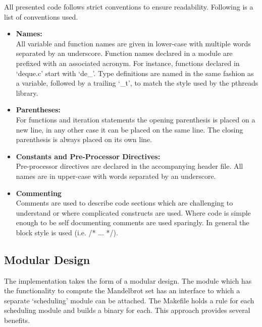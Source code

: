 All presented code follows strict conventions to ensure readability. Following is a list of conventions used.
\begin{itemize}
\item \textbf{Names: } \\
            All variable and function names are given in lower-case with multiple words separated by an underscore.
            Function names declared in a module are prefixed with an associated acronym. For instance, functions declared in 
            `deque.c' start with `de\_'.
            Type definitions are named in the same fashion as a variable, followed by a trailing `\_t', to match the style used 
            by the pthreads library.
            
\item \textbf{Parentheses: } \\
            For functions and iteration statements the opening parenthesis is placed on a new line, in any other case it
            can be placed on the same line. The closing parenthesis is always placed on its own line.
                        
\item \textbf{Constants and Pre-Processor Directives: } \\
            Pre-processor directives are declared in the accompanying header file. All names are in upper-case
            with words separated by an underscore.
\item \textbf{Commenting} \\
            Comments are used to describe code sections which are challenging to understand or 
            where complicated constructs are used. 
            Where code is simple enough to be self documenting comments are used sparingly.
            In general the block style is used (i.e. /{}* ... *{}/).
\end{itemize}

\subsection*{Modular Design}

The implementation takes the form of a modular design. The module which has the functionality to compute the Mandelbrot set
has an interface to which a separate `scheduling' module can be attached. The Makefile holds a rule for each scheduling 
module and builds a binary for each. This approach provides several benefits. 

